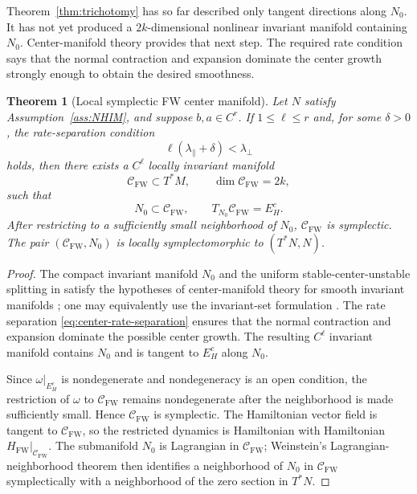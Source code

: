 \documentclass[11pt]{article}
\newtheorem{theorem}{Theorem}[section]
\theoremstyle{definition}
\theoremstyle{remark}
\newcommand{\C}{\mathcal{C}}
\newcommand{\Hs}{H_{\mathrm{FW}}}
\begin{document}
Theorem~\ref{thm:trichotomy} has so far described only tangent directions along $N_0$.  It has not yet produced a $2k$-dimensional nonlinear invariant manifold containing $N_0$.  Center-manifold theory provides that next step.  The required rate condition says that the normal contraction and expansion dominate the center growth strongly enough to obtain the desired smoothness.

\begin{theorem}[Local symplectic FW center manifold]
\label{thm:carrier}
Let $N$ satisfy Assumption~\ref{ass:NHIM}, and suppose $b,a\in C^r$.  If $1\le\ell\le r$ and, for some $\delta>0$, the rate-separation condition
\begin{equation}
\ell(\lambda_{\parallel}+\delta)<\lambda_{\perp}
\label{eq:center-rate-separation}
\end{equation}
holds, then there exists a $C^\ell$ locally invariant manifold
\begin{equation}
\C_{\mathrm{FW}}\subset T^*M,
\qquad
\dim \C_{\mathrm{FW}}=2k,
\label{eq:carrier}
\end{equation}
such that
\begin{equation}
N_0\subset\C_{\mathrm{FW}},
\qquad
T_{N_0}\C_{\mathrm{FW}}=E_H^c.
\label{eq:carrier-tangent}
\end{equation}
After restricting to a sufficiently small neighborhood of $N_0$, $\C_{\mathrm{FW}}$ is symplectic.  The pair $(\C_{\mathrm{FW}},N_0)$ is locally symplectomorphic to $(T^*N,N)$.
\end{theorem}

\begin{proof}
The compact invariant manifold $N_0$ and the uniform stable-center-unstable splitting in  satisfy the hypotheses of center-manifold theory for smooth invariant manifolds \cite{ChowLiuYi2000Smooth}; one may equivalently use the invariant-set formulation \cite{ChowLiuYi2000Sets}.  The rate separation \eqref{eq:center-rate-separation} ensures that the normal contraction and expansion dominate the possible center growth.  The resulting $C^\ell$ invariant manifold contains $N_0$ and is tangent to $E_H^c$ along $N_0$.

Since $\omega|_{E_H^c}$ is nondegenerate and nondegeneracy is an open condition, the restriction of $\omega$ to $\C_{\mathrm{FW}}$ remains nondegenerate after the neighborhood is made sufficiently small.  Hence $\C_{\mathrm{FW}}$ is symplectic.  The Hamiltonian vector field is tangent to $\C_{\mathrm{FW}}$, so the restricted dynamics is Hamiltonian with Hamiltonian $\Hs|_{\C_{\mathrm{FW}}}$.  The submanifold $N_0$ is Lagrangian in $\C_{\mathrm{FW}}$; Weinstein's Lagrangian-neighborhood theorem \cite{Weinstein1971} then identifies a neighborhood of $N_0$ in $\C_{\mathrm{FW}}$ symplectically with a neighborhood of the zero section in $T^*N$.
\end{proof}
\end{document}
